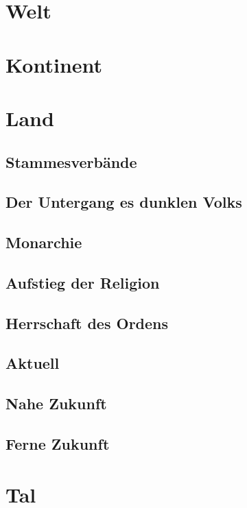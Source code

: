 \chapter{Welt}
\chapter{Kontinent}
\chapter{Land}
\section{Stammesverbände}
\section{Der Untergang es dunklen Volks}
\section{Monarchie}
\section{Aufstieg der Religion}
\section{Herrschaft des Ordens}
\section{Aktuell}
\section{Nahe Zukunft}
\section{Ferne Zukunft}

\chapter{Tal}